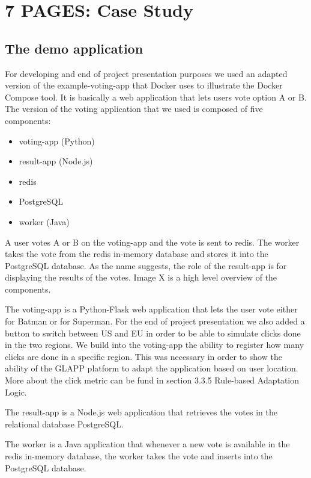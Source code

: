 \documentclass{seal_thesis}
\begin{document}
\chapter{7 PAGES: Case Study}\label{ch:casestudy}

\section{The demo application}
For developing and end of project presentation purposes we used an adapted version of the example-voting-app that Docker uses to illustrate the Docker Compose tool.
It is basically a web application that lets users vote option A or B.
The version of the voting application that we used is composed of five components:
\begin{itemize}
	\item voting-app (Python)
	\item result-app (Node.js)
	\item redis
	\item PostgreSQL
	\item worker (Java)
\end{itemize}
A user votes A or B on the voting-app and the vote is sent to redis.
The worker takes the vote from the redis in-memory database and stores it into the PostgreSQL database.
As the name suggests, the role of the result-app is for displaying the results of the votes.
Image X is a high level overview of the components.

The voting-app is a Python-Flask web application that lets the user vote either for Batman or for Superman.
For the end of project presentation we also added a button to switch between US and EU in order to be able to simulate clicks done in the two regions.
We build into the voting-app the ability to register how many clicks are done in a specific region.
This was necessary in order to show the ability of the GLAPP platform to adapt the application based on user location.
More about the click metric can be fund in section 3.3.5 Rule-based Adaptation Logic.

The result-app is a Node.js web application that retrieves the votes in the relational database PostgreSQL.

The worker is a Java application that whenever a new vote is available in the redis in-memory database, the worker takes the vote and inserts into the PostgreSQL database.
\end{document}
